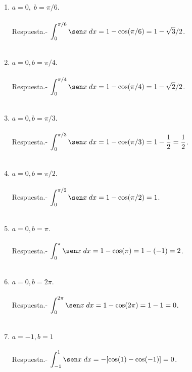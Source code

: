 \begin{enumerate}[\bfseries 1.]
    \begin{enumerate}[\bfseries (a)]

	\item $a=0,\; b=\pi/6.$\\\\
	    Respuesta.-\; $\displaystyle\int_0^{\pi/6}\sen x \; dx = 1-\cos(\pi/6) = 1-\sqrt{3}/2$.\\\\

	\item $a=0,b=\pi/4.$\\\\
	    Respuesta.-\; $\displaystyle\int_0^{\pi/4}\sen x \; dx = 1-\cos(\pi/4) = 1-\sqrt{2}/2$.\\\\

	\item $a=0,b=\pi/3.$\\\\
	    Respuesta.-\; $\displaystyle\int_0^{\pi/3}\sen x \; dx = 1-\cos(\pi/3) = 1-\dfrac{1}{2}=\dfrac{1}{2}$.\\\\

	\item $a=0,b=\pi/2.$\\\\
	    Respuesta.-\; $\displaystyle\int_0^{\pi/2}\sen x \; dx = 1-\cos(\pi/2) = 1$.\\\\

	\item $a=0,b=\pi.$\\\\
	    Respuesta.-\; $\displaystyle\int_0^{\pi}\sen x \; dx = 1-\cos(\pi) = 1-(-1) = 2$.\\\\

	\item $a=0,b=2\pi.$\\\\
	    Respuesta.-\; $\displaystyle\int_0^{2\pi}\sen x \; dx = 1-\cos(2\pi) = 1-1 = 0$.\\\\

	\item $a=-1,b=1$\\\\
	    Respuesta.-\; $\displaystyle\int_{-1}^{1}\sen x \; dx = -[\cos(1) - \cos( -1)] = 0$.\\\\


\end{enumerate}
\end{enumerate}
